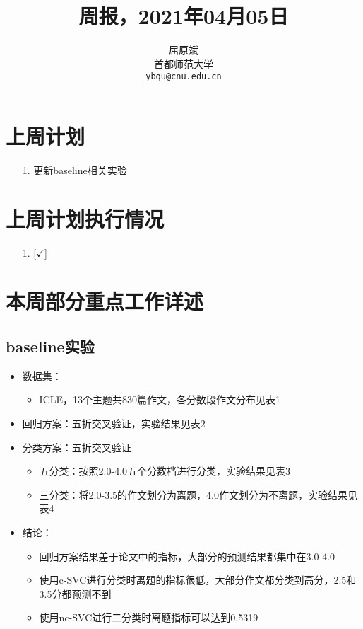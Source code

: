 \documentclass[11pt]{article}
\title{周报，2021年04月05日}
\author{屈原斌 \\
  首都师范大学 \\
    {\tt ybqu@cnu.edu.cn}}
\date{}
\begin{document}
\begin{CJK}{UTF8}{gkai}

\maketitle
\CJKindent

\section{上周计划}


\begin{itemize}
  \item [1.] 更新baseline相关实验
\end{itemize}


\section{上周计划执行情况}
\begin{itemize}
\item [1.] [$\checkmark$] 
\end{itemize}

\section{本周部分重点工作详述}

\subsection{baseline实验}

\begin{itemize}
  \item 数据集：
  \begin{itemize}
    \item ICLE，13个主题共830篇作文，各分数段作文分布见表1
  \end{itemize}
  \item 回归方案：五折交叉验证，实验结果见表2
  \item 分类方案：五折交叉验证
  \begin{itemize}
    \item 五分类：按照2.0-4.0五个分数档进行分类，实验结果见表3
    \item 三分类：将2.0-3.5的作文划分为离题，4.0作文划分为不离题，实验结果见表4
  \end{itemize}
  \item 结论：
  \begin{itemize}
    \item 回归方案结果差于论文中的指标，大部分的预测结果都集中在3.0-4.0
    \item 使用c-SVC进行分类时离题的指标很低，大部分作文都分类到高分，2.5和3.5分都预测不到
    \item 使用nc-SVC进行二分类时离题指标可以达到0.5319
  \end{itemize}
\end{itemize}


\end{CJK}
\end{document}
